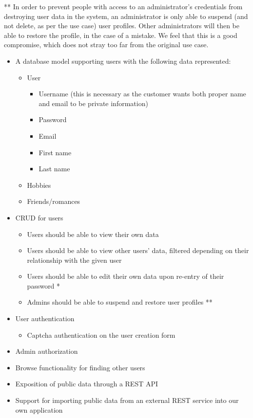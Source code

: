 \documentclass[a4paper]{article}
\begin{document}
** In order to prevent people with access to an administrator's credentials from destroying user data in the system, an administrator is only able to suspend (and not delete, as per the use case) user profiles. Other administrators will then be able to restore the profile, in the case of a mistake. We feel that this is a good compromise, which does not stray too far from the original use case.
\begin{itemize}
\item A database model supporting users with the following data represented:
  \begin{itemize}
  \item User
      \begin{itemize}
      \item Username (this is necessary as the customer wants both proper name and email to be private information)
      \item Password
      \item Email
      \item First name
      \item Last name
      \end{itemize}
  \item Hobbies
  \item Friends/romances
  \end{itemize}
\item CRUD for users
	\begin{itemize}
    \item Users should be able to view their own data
    \item Users should be able to view other users' data, filtered depending on their relationship with the given user
    \item Users should be able to edit their own data upon re-entry of their password *
    \item Admins should be able to suspend and restore user profiles **
    \end{itemize}
\item User authentication
	\begin{itemize}
	\item Captcha authentication on the user creation form
	\end{itemize}
\item Admin authorization
\item Browse functionality for finding other users
\item Exposition of public data through a REST API
\item Support for importing public data from an external REST service into our own application
\end{itemize}
\end{document}
